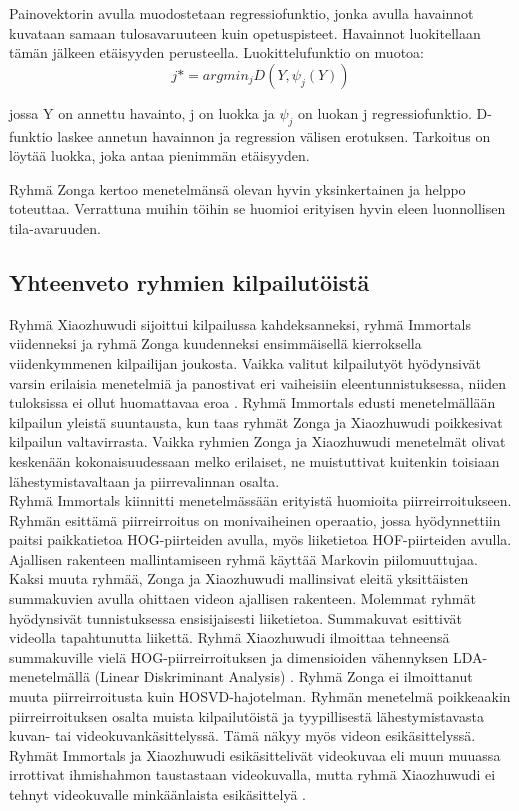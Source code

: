 Painovektorin avulla muodostetaan regressiofunktio, jonka avulla havainnot kuvataan samaan tulosavaruuteen kuin opetuspisteet. Havainnot
luokitellaan tämän jälkeen etäisyyden perusteella. Luokittelufunktio on muotoa:
\begin{equation}
j*=argmin_{j}D(Y,\psi_{j}(Y))
\end{equation}

jossa Y on annettu havainto, j on luokka ja $\psi_{j}$ on luokan j regressiofunktio. D-funktio laskee annetun havainnon ja regression välisen erotuksen.
Tarkoitus on löytää luokka, joka antaa pienimmän etäisyyden. 

Ryhmä Zonga kertoo menetelmänsä olevan hyvin yksinkertainen ja helppo toteuttaa. 
Verrattuna muihin töihin se huomioi erityisen hyvin eleen luonnollisen tila-avaruuden.\citep{firstround} 

\subsection{Yhteenveto ryhmien kilpailutöistä}

Ryhmä Xiaozhuwudi sijoittui kilpailussa kahdeksanneksi, ryhmä Immortals viidenneksi ja ryhmä Zonga kuudenneksi ensimmäisellä kierroksella
viidenkymmenen kilpailijan joukosta. Vaikka valitut kilpailutyöt hyödynsivät varsin erilaisia menetelmiä ja panostivat eri vaiheisiin eleentunnistuksessa,
niiden tuloksissa ei ollut huomattavaa eroa \citep{6239178}. Ryhmä Immortals edusti menetelmällään kilpailun yleistä suuntausta,
kun taas ryhmät Zonga ja Xiaozhuwudi poikkesivat kilpailun valtavirrasta. Vaikka ryhmien Zonga ja Xiaozhuwudi menetelmät olivat keskenään
kokonaisuudessaan melko erilaiset, ne muistuttivat kuitenkin toisiaan lähestymistavaltaan ja piirrevalinnan osalta.\\

Ryhmä Immortals kiinnitti menetelmässään erityistä huomioita piirreirroitukseen. Ryhmän esittämä piirreirroitus on monivaiheinen operaatio,
jossa hyödynnettiin paitsi paikkatietoa HOG-piirteiden avulla, myös liiketietoa HOF-piirteiden avulla.
Ajallisen rakenteen mallintamiseen ryhmä käyttää Markovin piilomuuttujaa. Kaksi muuta ryhmää,
Zonga ja Xiaozhuwudi mallinsivat eleitä yksittäisten summakuvien avulla ohittaen videon ajallisen rakenteen.
Molemmat ryhmät hyödynsivät tunnistuksessa ensisijaisesti liiketietoa. Summakuvat esittivät videolla tapahtunutta liikettä.
Ryhmä Xiaozhuwudi ilmoittaa tehneensä summakuville vielä HOG-piirreirroituksen ja dimensioiden vähennyksen LDA-menetelmällä (Linear Diskriminant Analysis) \citep{6239179}.
Ryhmä Zonga ei ilmoittanut muuta piirreirroitusta kuin HOSVD-hajotelman. Ryhmän menetelmä poikkeaakin piirreirroituksen osalta
muista kilpailutöistä ja tyypillisestä lähestymistavasta kuvan- tai videokuvankäsittelyssä. Tämä näkyy myös videon esikäsittelyssä. 
Ryhmät Immortals ja Xiaozhuwudi esikäsittelivät videokuvaa eli muun muuassa irrottivat ihmishahmon taustastaan videokuvalla,
mutta ryhmä Xiaozhuwudi ei tehnyt videokuvalle minkäänlaista esikäsittelyä \citep{firstround}.\\

